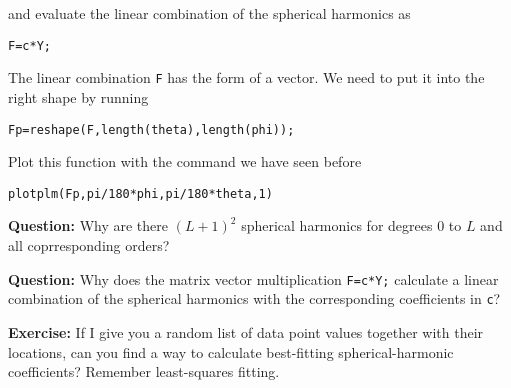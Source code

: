 \documentclass[11pt]{article}
\begin{document}
and evaluate the linear combination of the spherical harmonics as

\quad \verb!F=c*Y;!

The linear combination \verb!F! has the form of a vector. We need to
put it into the right shape by running

\quad \verb!Fp=reshape(F,length(theta),length(phi));!

Plot this function with the command we have seen before

\qquad \verb+plotplm(Fp,pi/180*phi,pi/180*theta,1)+

\textbf{Question:} Why are there $(L+1)^2$ spherical harmonics for
degrees 0 to $L$ and all coprresponding orders?

\textbf{Question:} Why does the matrix vector multiplication
\verb!F=c*Y;! calculate a linear combination of the spherical
harmonics with the corresponding coefficients in \verb+c+?


\textbf{Exercise:} If I give you a random list of data point values
together with their locations, can you find a way to calculate
best-fitting spherical-harmonic coefficients? Remember least-squares
fitting.
\end{document}
